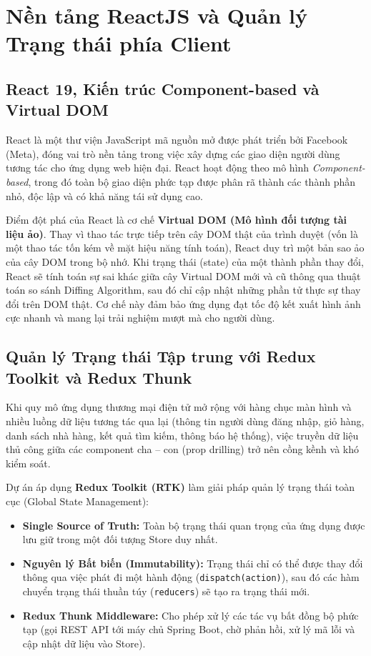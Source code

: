 \documentclass{uetgraduation}
\begin{document}
\section{Nền tảng ReactJS và Quản lý Trạng thái phía Client}
\subsection{React 19, Kiến trúc Component-based và Virtual DOM}
React là một thư viện JavaScript mã nguồn mở được phát triển bởi Facebook (Meta), đóng vai trò nền tảng trong việc xây dựng các giao diện người dùng tương tác cho ứng dụng web hiện đại. React hoạt động theo mô hình \textit{Component-based}, trong đó toàn bộ giao diện phức tạp được phân rã thành các thành phần nhỏ, độc lập và có khả năng tái sử dụng cao.

Điểm đột phá của React là cơ chế \textbf{Virtual DOM (Mô hình đối tượng tài liệu ảo)}. Thay vì thao tác trực tiếp trên cây DOM thật của trình duyệt (vốn là một thao tác tốn kém về mặt hiệu năng tính toán), React duy trì một bản sao ảo của cây DOM trong bộ nhớ. Khi trạng thái (state) của một thành phần thay đổi, React sẽ tính toán sự sai khác giữa cây Virtual DOM mới và cũ thông qua thuật toán so sánh Diffing Algorithm, sau đó chỉ cập nhật những phần tử thực sự thay đổi trên DOM thật. Cơ chế này đảm bảo ứng dụng đạt tốc độ kết xuất hình ảnh cực nhanh và mang lại trải nghiệm mượt mà cho người dùng.

\subsection{Quản lý Trạng thái Tập trung với Redux Toolkit và Redux Thunk}
Khi quy mô ứng dụng thương mại điện tử mở rộng với hàng chục màn hình và nhiều luồng dữ liệu tương tác qua lại (thông tin người dùng đăng nhập, giỏ hàng, danh sách nhà hàng, kết quả tìm kiếm, thông báo hệ thống), việc truyền dữ liệu thủ công giữa các component cha -- con (prop drilling) trở nên cồng kềnh và khó kiểm soát.

Dự án áp dụng \textbf{Redux Toolkit (RTK)} làm giải pháp quản lý trạng thái toàn cục (Global State Management):
\begin{itemize}
    \item \textbf{Single Source of Truth:} Toàn bộ trạng thái quan trọng của ứng dụng được lưu giữ trong một đối tượng Store duy nhất.
    \item \textbf{Nguyên lý Bất biến (Immutability):} Trạng thái chỉ có thể được thay đổi thông qua việc phát đi một hành động (\texttt{dispatch(action)}), sau đó các hàm chuyển trạng thái thuần túy (\texttt{reducers}) sẽ tạo ra trạng thái mới.
    \item \textbf{Redux Thunk Middleware:} Cho phép xử lý các tác vụ bất đồng bộ phức tạp (gọi REST API tới máy chủ Spring Boot, chờ phản hồi, xử lý mã lỗi và cập nhật dữ liệu vào Store).
\end{itemize}
\end{document}
